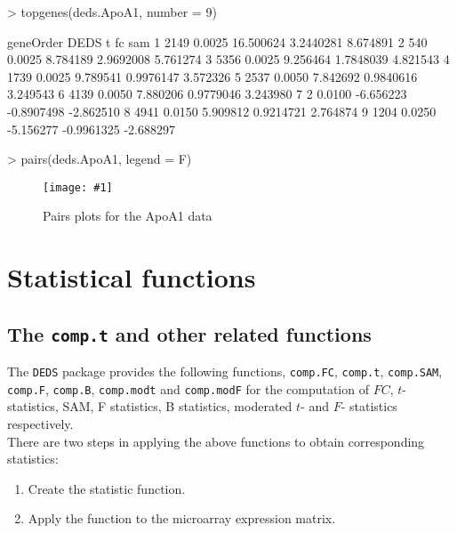 \documentclass[11pt]{article}
\newcommand{\code}[1]{{\tt #1}}
\newcommand{\Rfunc}[1]{{\tt #1}}
\newcommand{\myincfig}[3]{%
  \begin{figure}[htbp]
    \begin{center}
      \texttt{[image: \#1]}
      \caption{\label{#1}#3}
    \end{center}
  \end{figure}
}
\begin{document}
\begin{Schunk}
\begin{Sinput}
> topgenes(deds.ApoA1, number = 9)
\end{Sinput}
\begin{Soutput}
  geneOrder   DEDS         t         fc       sam
1      2149 0.0025 16.500624  3.2440281  8.674891
2       540 0.0025  8.784189  2.9692008  5.761274
3      5356 0.0025  9.256464  1.7848039  4.821543
4      1739 0.0025  9.789541  0.9976147  3.572326
5      2537 0.0050  7.842692  0.9840616  3.249543
6      4139 0.0050  7.880206  0.9779046  3.243980
7         2 0.0100 -6.656223 -0.8907498 -2.862510
8      4941 0.0150  5.909812  0.9214721  2.764874
9      1204 0.0250 -5.156277 -0.9961325 -2.688297
\end{Soutput}
\end{Schunk}

\begin{Schunk}
\begin{Sinput}
> pairs(deds.ApoA1, legend = F)
\end{Sinput}
\end{Schunk}

\myincfig{DEDS-pairsApoA1}{\textwidth}{Pairs plots for the ApoA1 data}

\section{Statistical functions}

\subsection{The \Rfunc{comp.t} and other related functions}

The \code{DEDS} package provides the following functions, \Rfunc{comp.FC},
\Rfunc{comp.t}, \Rfunc{comp.SAM}, \Rfunc{comp.F}, \Rfunc{comp.B},
\Rfunc{comp.modt} and \Rfunc{comp.modF} for the computation
of $FC$, $t$-statistics, SAM, F statistics, B statistics, moderated $t$- and
$F$- statistics respectively. \\

There are two steps in applying the above functions to obtain corresponding 
statistics:
\begin{enumerate}
\item Create the statistic function.
\item Apply the function to the microarray expression matrix.
\end{enumerate}
\end{document}
